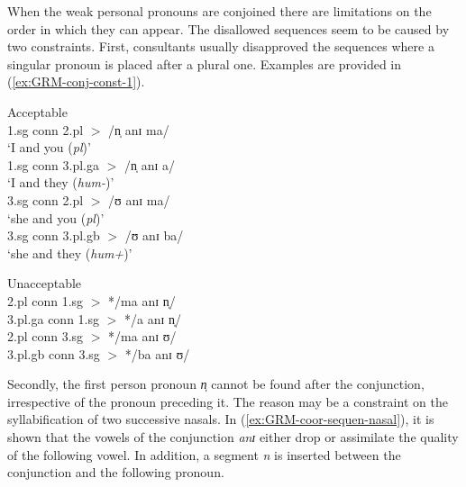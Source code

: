 \begin{exe}
\begin{exe}
\begin{exe}
{\begin{exe}
\begin{exe}
\begin{exe}
\begin{exe}
\begin{exe}
\begin{exe}
\begin{exe}
\begin{xlist}
\begin{exe}
\begin{exe}
\begin{exe}
\begin{exe}
\begin{exe}
\begin{exe}
\begin{exe}
\begin{exe}
\begin{exe}
\begin{exe}
When the weak personal pronouns are conjoined there are limitations on the 
order 
in which they can appear. The disallowed sequences seem to be caused by two 
constraints. First, consultants usually disapproved   the sequences where a 
singular pronoun is placed after a plural one. Examples are provided in 
(\ref{ex:GRM-conj-const-1}).



\ea\label{ex:GRM-conj-const-1}
\begin{multicols}{2}

\ea\label{ex:GRM-conj-const-1-g}{\rm Acceptable}\\
1.sg {\sc conn} 2.pl $>$ /n̩ anɪ ma/ \\
`I and you ({\it pl})'\\
1.sg {\sc conn} 3.pl.{\sc g}a  $>$   /n̩ anɪ a/ \\
`I and they ({\it hum-})'\\
3.sg  {\sc conn} 2.pl $>$ /ʊ anɪ ma/ \\
 `she and you ({\it pl})'\\
3.sg {\sc conn} 3.pl.{\sc g}b $>$   /ʊ anɪ ba/\\
`she and they ({\it hum+})'

\columnbreak 
\vfill

\ex\label{ex:GRM-conj-const-1-ng}{\rm Unacceptable}\\
2.pl {\sc conn} 1.sg  $>$ */ma  anɪ n̩/\\
3.pl.{\sc g}a   {\sc conn} 1.sg  $>$  */a anɪ n̩/\\
2.pl  {\sc conn} 3.sg $>$ */ma anɪ ʊ/\\
3.pl.{\sc g}b  {\sc conn} 3.sg $>$ */ba anɪ ʊ/\\

\z 
\end{multicols}
 \z

Secondly, the first person pronoun {\it n̩} cannot be found after the 
conjunction, irrespective of the pronoun preceding it. The reason may be a 
constraint on the syllabification of two successive nasals.  In 
(\ref{ex:GRM-coor-sequen-nasal}), it is shown that the vowels of the 
conjunction 
{\it anɪ} either  drop or assimilate the quality of the following vowel. In 
addition, a segment  {\it n} is inserted between the conjunction and the 
following pronoun. 




\end{exe}
\end{exe}
\end{exe}
\end{exe}
\end{exe}
\end{exe}
\end{exe}
\end{exe}
\end{exe}
\end{exe}
\end{xlist}
\end{exe}
\end{exe}
\end{exe}
\end{exe}
\end{exe}
\end{exe}
\end{exe}}
\end{exe}
\end{exe}
\end{exe}
